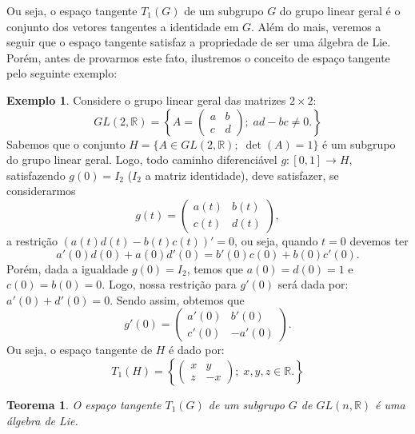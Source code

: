 \documentclass[twoside,openright,titlepage,numbers=noenddot,headinclude,  lineheaders footinclude=true,cleardoublepage=empty,
                                BCOR=5mm,paper=a4,fontsize=12pt ]{scrbook}
\newtheorem{teo}{Teorema}[chapter]
\theoremstyle{definition}
\newtheorem{exmp}{Exemplo}[section]
\begin{document}
Ou seja, o espaço tangente $T_1(G)$ de um subgrupo $G$ do grupo linear geral é o conjunto dos vetores tangentes a identidade em 
$G$. Além do mais, veremos a seguir que o espaço tangente satisfaz a propriedade de ser uma álgebra de Lie. Porém,
antes de provarmos este fato, ilustremos o conceito de espaço tangente pelo seguinte exemplo:
\begin{exmp}
Considere o grupo linear geral das matrizes $2 \times 2$:
\[ GL(2, \mathbb{R}) = \left\{ 
A= 
 \begin{pmatrix}
 a & b \\
 c & d
 \end{pmatrix}
; \;
ad - bc \neq 0. \right\} \]
Sabemos que o conjunto $H = \{ A \in GL(2, \mathbb{R}); \; \det(A) = 1 \}$ é um subgrupo do grupo linear geral.
Logo, todo caminho diferenciável $g:[0,1] \rightarrow H$, satisfazendo $g(0) = I_2$ ($I_2$ a matriz identidade),
deve satisfazer, se considerarmos
\[ g(t) =
 \begin{pmatrix}
 a(t) & b(t) \\
 c(t) & d(t)
 \end{pmatrix}
 ,
\]
a restrição $ ( a(t)d(t) - b(t)c(t) )' = 0$, ou seja, quando $t = 0$ devemos ter
\[ a'(0)d(0) + a(0)d'(0) = b'(0)c(0) + b(0)c'(0). \]
Porém, dada a igualdade $g(0) = I_2$, temos que
$a(0) = d(0) = 1$ e $c(0) = b(0) = 0$. Logo, nossa restrição para $g'(0)$ será dada por:
$a'(0) + d'(0) = 0$. Sendo assim, obtemos que
\[ g'(0) =
 \begin{pmatrix}
 a'(0) & b'(0) \\
 c'(0) & -a'(0)
 \end{pmatrix}
.
\]
Ou seja, o espaço tangente de $H$ é dado por:
\[ T_1(H) = 
\left\{
 \begin{pmatrix}
 x & y \\
 z & -x
 \end{pmatrix}
 ; \;
 x, y, z \in \mathbb{R}.
 \right\}
\]
\end{exmp}

\begin{teo}\label{tg_lie}
O espaço tangente $T_1(G)$ de um subgrupo $G$ de $GL(n, \mathbb{R})$ é uma álgebra de Lie.
\end{teo}
\end{document}
